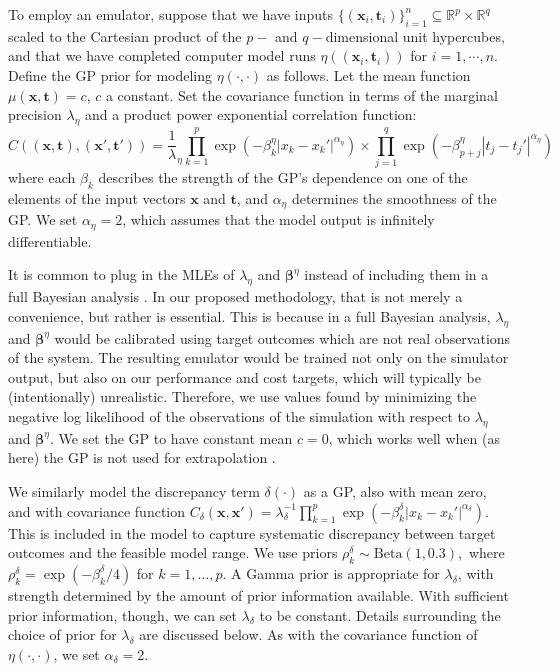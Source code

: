 \documentclass[12pt]{article}
\begin{document}
To employ an emulator, suppose that we have inputs $\{(\mathbf x_i,\mathbf t_i)\}_{i=1}^n\subseteq \mathbb R^p\times \mathbb R^q$ scaled to the Cartesian product of the $p-$ and $q-$dimensional unit hypercubes, and that we have completed computer model runs 
%
$\eta\left((\mathbf x_i,\mathbf t_i)\right)$ for $i=1,\cdots,n.$
%
Define the GP prior for modeling $\eta(\cdot,\cdot)$ as follows. 
%
Let the mean function $\mu(\mathbf x,\mathbf t)=c$, $c$ a constant. 
%
Set the covariance function in terms of the marginal precision $\lambda_\eta$ and a product power exponential correlation function:
%
\begin{equation}\label{eq:Hig_cov}
C((\mathbf x,\mathbf t),(\mathbf x',\mathbf t')) = \frac 1\lambda_\eta \prod_{k=1}^{p}
\exp \left(-\beta^\eta_k|x_k-x_k'|^{\alpha_\eta}\right) \times
\prod_{j=1}^{q}
\exp \left(-\beta^\eta_{p+j}|t_j-t_j'|^{\alpha_\eta}\right)
\end{equation}
%
where each $\beta_k$ describes the strength of the GP's dependence on one of the elements of the input vectors $\mathbf x$ and $\mathbf t$, and $\alpha_\eta$ determines the smoothness of the GP. 
%
We set $\alpha_\eta = 2$, which assumes that the model output is infinitely differentiable.

It is common to plug in the MLEs of $\lambda_\eta$ and $\boldsymbol \beta^\eta$ instead of including them in a full Bayesian analysis \citep{Kennedy2001,Santner2003a,Qian2008,Paulo2012}.
%
In our proposed methodology, that is not merely a convenience, but rather is essential.
%
This is because in a full Bayesian analysis, $\lambda_\eta$ and $\boldsymbol\beta^\eta$ would be calibrated using target outcomes which are not real observations of the system.
%
The resulting emulator would be trained not only on the simulator output, but also on our performance and cost targets, which will typically be (intentionally) unrealistic.
%
Therefore, we use values found by minimizing the negative log likelihood of the observations of the simulation with respect to $\lambda_\eta$ and $\boldsymbol\beta^\eta$.
%
We set the GP to have constant mean $c=0$, which works well when (as here) the GP is not used for extrapolation \citep{Bayarri2007}.
%

We similarly model the discrepancy term $\delta(\cdot)$ as a GP, also with mean zero, and with covariance function
%
$C_\delta(\mathbf x,\mathbf x') = \lambda_\delta^{-1} \prod_{k=1}^p
\exp\left( -\beta_k^\delta |x_k-x_k'|^{\alpha_\delta} \right).$
%
This is included in the model to capture systematic discrepancy between target outcomes and the feasible model range.
%
We use priors
$\rho^\delta_k \sim \mathrm{Beta}(1,0.3),$
where $\rho_k^\delta = \exp(-\beta_k^\delta/4)$ for $k=1,\ldots,p$. 
%
A Gamma prior is appropriate for $\lambda_\delta$, with strength determined by the amount of prior information available. 
%
With sufficient prior information, though, we can set $\lambda_\delta$ to be constant. 
%
Details surrounding the choice of prior for $\lambda_\delta$ are discussed below.
%
As with the covariance function of $\eta(\cdot,\cdot)$, we set $\alpha_\delta=2$.
\end{document}
